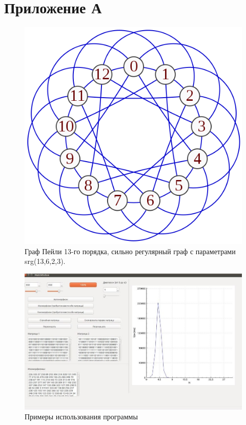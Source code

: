 \section*{Приложение А}
\label{sec:Appendix_1} 
\large

\begin{figure}[ht]
\centering 
    \includegraphics[scale=0.7]{image/srg_example.png}
    \caption{Граф Пейли 13-го порядка, сильно регулярный граф с параметрами srg(13,6,2,3).}
    \label{srg}
\end{figure}

\begin{figure}[H]
\centering
    \includegraphics[scale=0.5]{image/program_example.jpeg}
    \caption{Примеры использования программы}
    \label{program_example}
\end{figure}
